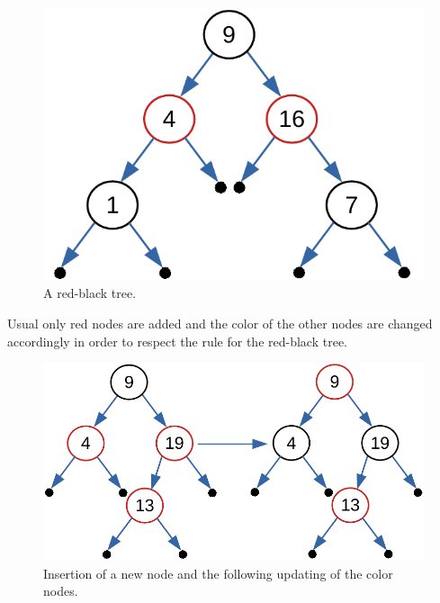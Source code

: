 \begin{figure}[H]
	\begin{center}
		\includegraphics[scale=.6]{chapters/trees/images/trees_20.pdf}
		\caption[A red-black tree.]{A red-black tree.}
		\label{trees_20}
	\end{center}
\end{figure}

Usual only red nodes are added and the color of the other nodes are changed accordingly in order to respect the rule for the red-black tree.

\begin{figure}[H]
	\begin{center}
		\includegraphics[scale=.6]{chapters/trees/images/trees_21.pdf}
		\caption[Insertion of a new node and the following updating of the color nodes.]{Insertion of a new node and the following updating of the color nodes.}
		\label{trees_21}
	\end{center}
\end{figure}

